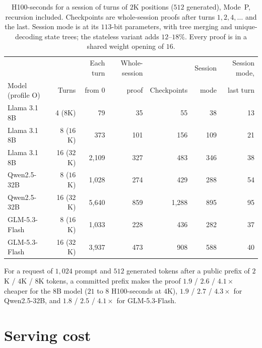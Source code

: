 \documentclass[11pt]{article}
\begin{document}
\begin{table}[h]
\centering\small
\begin{tabular}{@{}lrrrrrr@{}}
\toprule
& & Each turn & Whole-session & & Session & Session mode, \\
Model (profile O) & Turns & from \(0\) & proof & Checkpoints & mode & last turn \\
\midrule
Llama 3.1 8B & 4 (\(8\)K) & 79 & 35 & 55 & 38 & 13 \\
Llama 3.1 8B & 8 (\(16\)K) & 373 & 101 & 156 & 109 & 21 \\
Llama 3.1 8B & 16 (\(32\)K) & 2{,}109 & 327 & 483 & 346 & 38 \\
Qwen2.5-32B & 8 (\(16\)K) & 1{,}028 & 274 & 429 & 288 & 54 \\
Qwen2.5-32B & 16 (\(32\)K) & 5{,}640 & 859 & 1{,}288 & 895 & 95 \\
GLM-5.3-Flash & 8 (\(16\)K) & 1{,}033 & 228 & 436 & 282 & 37 \\
GLM-5.3-Flash & 16 (\(32\)K) & 3{,}937 & 473 & 908 & 588 & 40 \\
\bottomrule
\end{tabular}
\caption{H100-seconds for a session of turns of \(2\)K positions (\(512\) generated), Mode~P, recursion included. Checkpoints are whole-session proofs after turns \(1, 2, 4, \ldots\) and the last. Session mode is at its \(113\)-bit parameters, with tree merging and unique-decoding state trees; the stateless variant adds \(12\)--\(18\%\). Every proof is in a shared weight opening of \(16\).}
\label{tab:session}
\end{table}

For a request of \(1{,}024\) prompt and \(512\) generated tokens after a public prefix of \(2\)K / \(4\)K / \(8\)K tokens, a committed prefix makes the proof \(1.9\) / \(2.6\) / \(4.1\times\) cheaper for the 8B model (\(21\) to \(8\) H100-seconds at \(4\)K), \(1.9\) / \(2.7\) / \(4.3\times\) for Qwen2.5-32B, and \(1.8\) / \(2.5\) / \(4.1\times\) for GLM-5.3-Flash.

\section{Serving cost}
\label{sec:serving}
\end{document}
